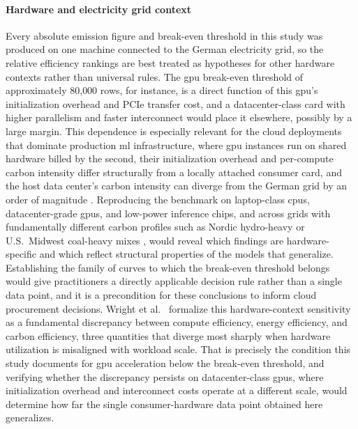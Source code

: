 \paragraph{Hardware and electricity grid context}
Every absolute emission figure and break-even threshold in this study was produced on one machine connected to the German electricity grid, so the relative efficiency rankings are best treated as hypotheses for other hardware contexts rather than universal rules. The \gls{gpu} break-even threshold of approximately 80{,}000 rows, for instance, is a direct function of this \gls{gpu}'s initialization overhead and PCIe transfer cost, and a datacenter-class card with higher parallelism and faster interconnect would place it elsewhere, possibly by a large margin. This dependence is especially relevant for the cloud deployments that dominate production \gls{ml} infrastructure, where \gls{gpu} instances run on shared hardware billed by the second, their initialization overhead and per-compute carbon intensity differ structurally from a locally attached consumer card, and the host data center's carbon intensity can diverge from the German grid by an order of magnitude \cite{hendersonSystematicReportingEnergy2020}. Reproducing the benchmark on laptop-class \glspl{cpu}, datacenter-grade \glspl{gpu}, and low-power inference chips, and across grids with fundamentally different carbon profiles such as Nordic hydro-heavy or U.S.\ Midwest coal-heavy mixes \cite{dodgeMeasuringCarbonIntensity2022}, would reveal which findings are hardware-specific and which reflect structural properties of the models that generalize. Establishing the family of curves to which the break-even threshold belongs would give practitioners a directly applicable decision rule rather than a single data point, and it is a precondition for these conclusions to inform cloud procurement decisions. Wright et al.\ \parencite{wrightEfficiencyNotEnough2025} formalize this hardware-context sensitivity as a fundamental discrepancy between compute efficiency, energy efficiency, and carbon efficiency, three quantities that diverge most sharply when hardware utilization is misaligned with workload scale. That is precisely the condition this study documents for \gls{gpu} acceleration below the break-even threshold, and verifying whether the discrepancy persists on datacenter-class \glspl{gpu}, where initialization overhead and interconnect costs operate at a different scale, would determine how far the single consumer-hardware data point obtained here generalizes.

